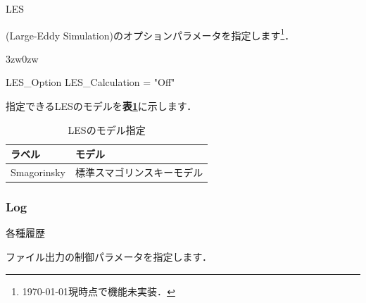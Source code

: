 \hypertarget{tgt:les_option}{LES}(Large-Eddy Simulation)のオプションパラメータを指定します\footnote{\today 現時点で機能未実装．}．

\begin{indentation}{3zw}{0zw}

{\small
\begin{program}
  LES_Option {
    LES_Calculation = "Off"
  }
\end{program}
}

指定できるLESのモデルを\textbf{表\ref{tbl:LES_model}}に示します．

\begin{table}[htdp]
\caption{LESのモデル指定}
\begin{center}
\small
\begin{tabular}{ll} \toprule
ラベル & モデル\\ \midrule
Smagorinsky & 標準スマゴリンスキーモデル\\ \bottomrule
\end{tabular}
\end{center}
\label{tbl:LES_model}
\end{table}

\end{indentation}



\pagebreak
\subsubsection{Log}

\hypertarget{tgt:log}{各種履歴}ファイル出力の制御パラメータを指定します．

